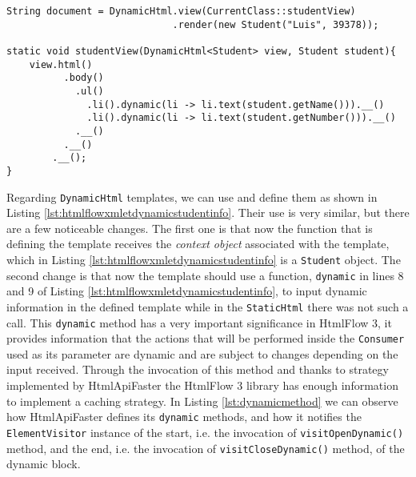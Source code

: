 \bigskip


\begin{minipage}{\linewidth}
\begin{lstlisting}[caption={HtmlFlow - Xmlet Template with Student Information}, label={lst:htmlflowxmletdynamicstudentinfo}]
String document = DynamicHtml.view(CurrentClass::studentView)
                             .render(new Student("Luis", 39378));

static void studentView(DynamicHtml<Student> view, Student student){
    view.html()
          .body()
            .ul()
              .li().dynamic(li -> li.text(student.getName())).__()
              .li().dynamic(li -> li.text(student.getNumber())).__()
            .__()
          .__()
        .__();   
}
\end{lstlisting}
\end{minipage} 

\noindent
Regarding \texttt{DynamicHtml} templates, we can use and define them as shown in Listing \ref{lst:htmlflowxmletdynamicstudentinfo}. Their use is very similar, but there are a few noticeable changes. The first one is that now the function that is defining the template receives the \textit{context object} associated with the template, which in Listing \ref{lst:htmlflowxmletdynamicstudentinfo} is a \texttt{Student} object. The second change is that now the template should use a function, \texttt{dynamic} in lines 8 and 9 of Listing \ref{lst:htmlflowxmletdynamicstudentinfo}, to input dynamic information in the defined template while in the \texttt{StaticHtml} there was not such a call. This \texttt{dynamic} method has a very important significance in HtmlFlow 3, it provides information that the actions that will be performed inside the \texttt{Consumer} used as its parameter are dynamic and are subject to changes depending on the input received. Through the invocation of this method and thanks to strategy implemented by HtmlApiFaster the HtmlFlow 3 library has enough information to implement a caching strategy. In Listing \ref{lst:dynamicmethod} we can observe how HtmlApiFaster defines its \texttt{dynamic} methods, and how it notifies the \texttt{ElementVisitor} instance of the start, i.e. the invocation of \texttt{visitOpenDynamic()} method, and the end, i.e. the invocation of \texttt{visitCloseDynamic()} method, of the dynamic block.

\bigskip


